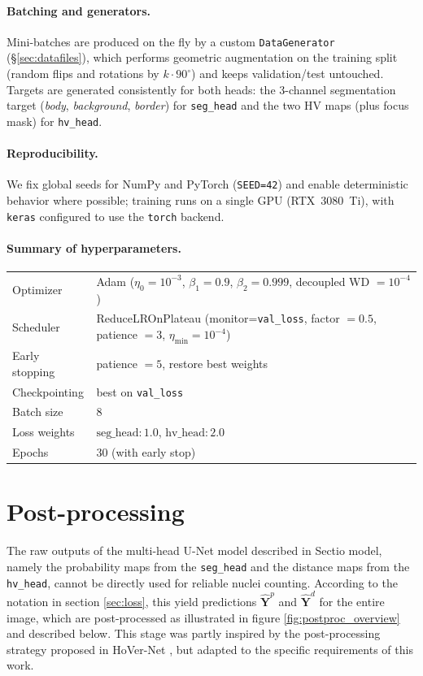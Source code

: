 \documentclass[target=bach,aauheader=,style=]{thud}
\begin{document}
\paragraph{Batching and generators.}
Mini-batches are produced on the fly by a custom \texttt{DataGenerator} (\S\ref{sec:datafiles}), which performs geometric augmentation on the training split (random flips and rotations by $k\cdot 90^\circ$) and keeps validation/test untouched. Targets are generated consistently for both heads: the 3-channel segmentation target (\emph{body}, \emph{background}, \emph{border}) for \texttt{seg\_head} and the two HV maps (plus focus mask) for \texttt{hv\_head}.

\paragraph{Reproducibility.}
We fix global seeds for NumPy and PyTorch (\texttt{SEED=42}) and enable deterministic behavior where possible; training runs on a single GPU (RTX~3080~Ti), with \texttt{keras} configured to use the \texttt{torch} backend.

\paragraph{Summary of hyperparameters.}
\begin{center}
\begin{tabular}{l l}
\hline
Optimizer & Adam ($\eta_0{=}10^{-3}$, $\beta_1{=}0.9$, $\beta_2{=}0.999$, decoupled WD $=10^{-4}$) \\
Scheduler & ReduceLROnPlateau (monitor=\texttt{val\_loss}, factor $=0.5$, patience $=3$, $\eta_{\min}{=}10^{-4}$) \\
Early stopping & patience $=5$, restore best weights \\
Checkpointing & best on \texttt{val\_loss} \\
Batch size & $8$ \\
Loss weights & $\text{seg\_head}:1.0$, $\text{hv\_head}:2.0$ \\
Epochs & $30$ (with early stop) \\
\hline
\end{tabular}
\end{center}
\section{Post-processing}
\label{sec:postprocessing}

The raw outputs of the multi-head U-Net model described in Sectio model, namely the probability maps from the \texttt{seg\_head} and the distance maps from the \texttt{hv\_head}, cannot be directly used for reliable nuclei counting. 
According to the notation in section \ref{sec:loss}, this yield predictions $\widehat{\mathbf{Y}}^p$ and $\widehat{\mathbf{Y}}^d$ for the entire image, which are post-processed as illustrated in figure \ref{fig:postproc_overview} and described below. 
This stage was partly inspired by the post-processing strategy proposed in HoVer-Net \cite{graham2019hovernet}, but adapted to the specific requirements of this work.
\end{document}
